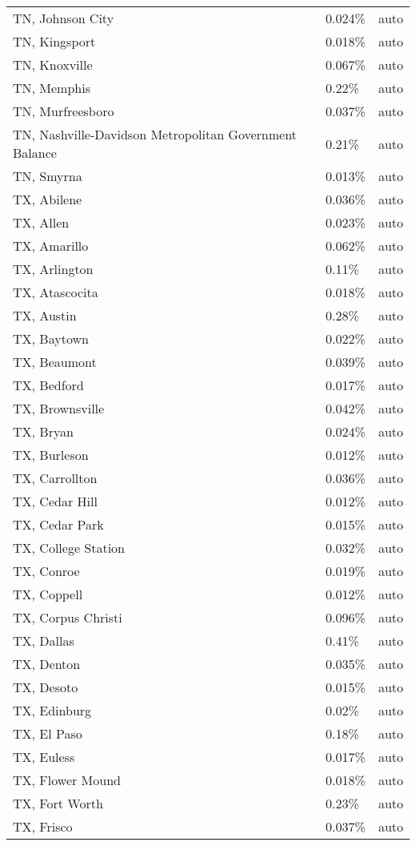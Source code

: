 \begin{longtable}[]{@{}lll@{}}
TN, Johnson City & 0.024\% & auto \\
TN, Kingsport & 0.018\% & auto \\
TN, Knoxville & 0.067\% & auto \\
TN, Memphis & 0.22\% & auto \\
TN, Murfreesboro & 0.037\% & auto \\
TN, Nashville-Davidson Metropolitan Government Balance & 0.21\% &
auto \\
TN, Smyrna & 0.013\% & auto \\
TX, Abilene & 0.036\% & auto \\
TX, Allen & 0.023\% & auto \\
TX, Amarillo & 0.062\% & auto \\
TX, Arlington & 0.11\% & auto \\
TX, Atascocita & 0.018\% & auto \\
TX, Austin & 0.28\% & auto \\
TX, Baytown & 0.022\% & auto \\
TX, Beaumont & 0.039\% & auto \\
TX, Bedford & 0.017\% & auto \\
TX, Brownsville & 0.042\% & auto \\
TX, Bryan & 0.024\% & auto \\
TX, Burleson & 0.012\% & auto \\
TX, Carrollton & 0.036\% & auto \\
TX, Cedar Hill & 0.012\% & auto \\
TX, Cedar Park & 0.015\% & auto \\
TX, College Station & 0.032\% & auto \\
TX, Conroe & 0.019\% & auto \\
TX, Coppell & 0.012\% & auto \\
TX, Corpus Christi & 0.096\% & auto \\
TX, Dallas & 0.41\% & auto \\
TX, Denton & 0.035\% & auto \\
TX, Desoto & 0.015\% & auto \\
TX, Edinburg & 0.02\% & auto \\
TX, El Paso & 0.18\% & auto \\
TX, Euless & 0.017\% & auto \\
TX, Flower Mound & 0.018\% & auto \\
TX, Fort Worth & 0.23\% & auto \\
TX, Frisco & 0.037\% & auto \\

\end{longtable}
